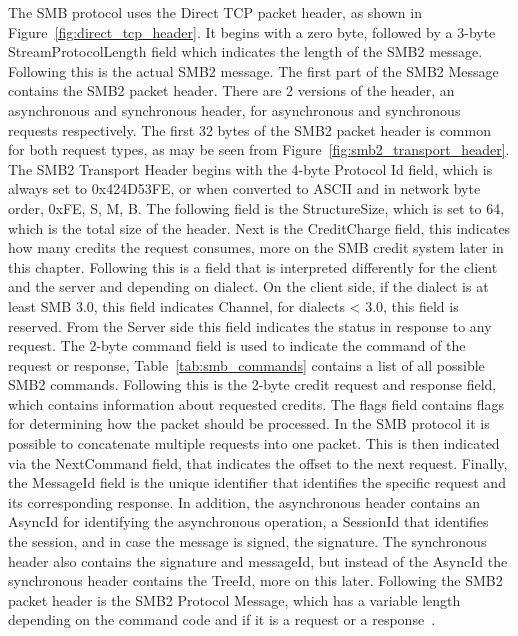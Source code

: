 \documentclass[english, 12pt, a4paper, elec, utf8, a-2b, online]{aaltothesis}
\begin{document}
The SMB protocol uses the Direct TCP packet header, as shown in Figure~\ref{fig:direct_tcp_header}.
It begins with a zero byte, followed by a 3-byte StreamProtocolLength field which
indicates the length of the SMB2 message. Following this is the actual SMB2 message.
The first part of the SMB2 Message contains the SMB2 packet header. There are 2 versions
of the header, an asynchronous and synchronous header, for asynchronous and synchronous
requests respectively. The first 32 bytes of the SMB2 packet header is common for both
request types, as may be seen from Figure~\ref{fig:smb2_transport_header}. The SMB2 Transport
Header begins with the 4-byte Protocol Id field, which is always set to 0x424D53FE,
or when converted to ASCII and in network byte order, 0xFE, S, M, B. The following field
is the StructureSize, which is set to 64, which is the total size of the header. Next
is the CreditCharge field, this indicates how many credits the request consumes, more on
the SMB credit system later in this chapter. Following this is a field that is 
interpreted differently for the client and the server and depending on dialect.
On the client side, if the dialect is at least SMB 3.0, this field indicates Channel,
for dialects < 3.0, this field is reserved. From the Server side this field indicates
the status in response to any request. The 2-byte command field is used to 
indicate the command of the request or response, Table~\ref{tab:smb_commands} contains
a list of all possible SMB2 commands. Following this is the 2-byte credit request and
response field, which contains information about requested credits. The flags field
contains flags for determining how the packet should be processed. In the SMB
protocol it is possible to concatenate multiple requests into one packet. This is then
indicated via the NextCommand field, that indicates the offset to the next request.
Finally, the MessageId field is the unique identifier that identifies the specific
request and its corresponding response. In addition, the asynchronous header contains an AsyncId for identifying the asynchronous
operation, a SessionId that identifies the session, and in case the message is signed,
the signature. The synchronous header also contains the signature and messageId, but instead
of the AsyncId the synchronous header contains the TreeId, more on this later. Following
the SMB2 packet header is the SMB2 Protocol Message, which has a variable length depending
on the command code and if it is a request or a response~\cite{smb2_tech}.
\end{document}

